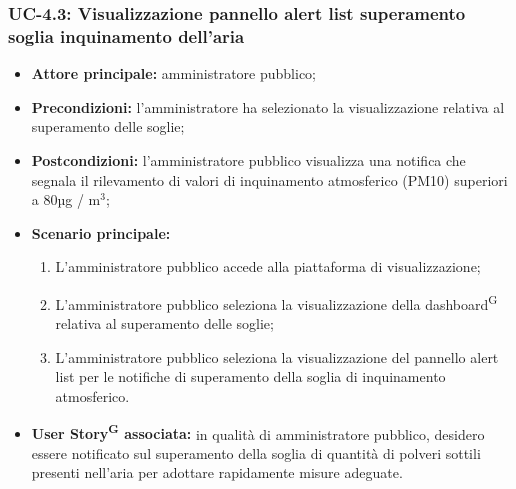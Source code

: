 \documentclass[8pt]{article}
\newcommand{\glossterm}[1]{#1\textsuperscript{G}} %
\begin{document}
\subsubsection*{UC-4.3: Visualizzazione pannello alert list superamento soglia inquinamento dell'aria}
\begin{itemize}
    \item \textbf{Attore principale:} amministratore pubblico;
    \item \textbf{Precondizioni:} l'amministratore ha selezionato la visualizzazione relativa al superamento delle soglie;
    \item \textbf{Postcondizioni:} l’amministratore pubblico visualizza una notifica che segnala il rilevamento di valori di inquinamento atmosferico (PM10) superiori a 80µg / $\mbox{m}^{\mbox{3}}$;
    \item \textbf{Scenario principale:}
        \begin{enumerate}
        \item L’amministratore pubblico accede alla piattaforma di visualizzazione;
        \item L’amministratore pubblico seleziona la visualizzazione della \glossterm{dashboard} relativa al superamento delle soglie;
        \item L'amministratore pubblico seleziona la visualizzazione del pannello alert list per le notifiche di superamento della soglia di inquinamento atmosferico.
        \end{enumerate}
    \item \textbf{\glossterm{User Story} associata:} in qualità di amministratore pubblico, desidero essere notificato sul superamento della soglia di quantità di polveri sottili presenti nell'aria per adottare rapidamente misure adeguate.
\end{itemize}
\end{document}
